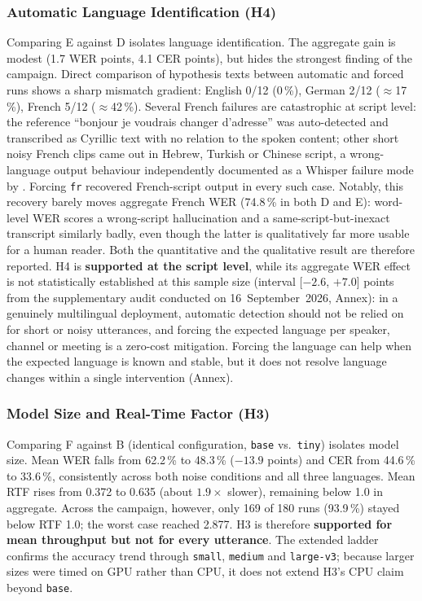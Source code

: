 \documentclass[12pt]{report}
\begin{document}
\subsubsection{Automatic Language Identification (H4)}
Comparing E against D isolates language identification. The aggregate gain is modest (1.7 WER points, 4.1 CER points), but hides the strongest finding of the campaign. Direct comparison of hypothesis texts between automatic and forced runs shows a sharp mismatch gradient: English 0/12 (0\,\%), German 2/12 ($\approx$17\,\%), French 5/12 ($\approx$42\,\%). Several French failures are catastrophic at script level: the reference \enquote{bonjour je voudrais changer d'adresse} was auto-detected and transcribed as Cyrillic text with no relation to the spoken content; other short noisy French clips came out in Hebrew, Turkish or Chinese script, a wrong-language output behaviour independently documented as a Whisper failure mode by \cite{koenecke2024careless}. Forcing \texttt{fr} recovered French-script output in every such case. Notably, this recovery barely moves aggregate French WER (74.8\,\% in both D and E): word-level WER scores a wrong-script hallucination and a same-script-but-inexact transcript similarly badly, even though the latter is qualitatively far more usable for a human reader. Both the quantitative and the qualitative result are therefore reported. H4 is \textbf{supported at the script level}, while its aggregate WER effect is not statistically established at this sample size (interval [$-2.6$, $+7.0$] points from the supplementary audit conducted on 16~September~2026, Annex): in a genuinely multilingual deployment, automatic detection should not be relied on for short or noisy utterances, and forcing the expected language per speaker, channel or meeting is a zero-cost mitigation. Forcing the language can help when the expected language is known and stable, but it does not resolve language changes within a single intervention (Annex).
\subsubsection{Model Size and Real-Time Factor (H3)}
Comparing F against B (identical configuration, \texttt{base} vs.\ \texttt{tiny}) isolates model size. Mean WER falls from 62.2\,\% to 48.3\,\% ($-13.9$ points) and CER from 44.6\,\% to 33.6\,\%, consistently across both noise conditions and all three languages. Mean RTF rises from 0.372 to 0.635 (about $1.9\times$ slower), remaining below 1.0 in aggregate. Across the campaign, however, only 169 of 180 runs (93.9\,\%) stayed below RTF 1.0; the worst case reached 2.877. H3 is therefore \textbf{supported for mean throughput but not for every utterance}. The extended ladder confirms the accuracy trend through \texttt{small}, \texttt{medium} and \texttt{large-v3}; because larger sizes were timed on GPU rather than CPU, it does not extend H3's CPU claim beyond \texttt{base}.
\end{document}
